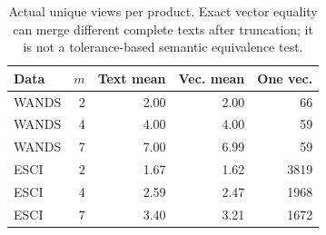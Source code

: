 \begin{table}[htbp]
\caption{Actual unique views per product. Exact vector equality can merge different complete texts after truncation; it is not a tolerance-based semantic equivalence test.}\label{tab:uniqueviews}
\centering\small
\begin{tabular}{lrrrr}\toprule
Data & $m$ & Text mean & Vec. mean & One vec.\\\midrule
WANDS & 2 & 2.00 & 2.00 & 66\\
WANDS & 4 & 4.00 & 4.00 & 59\\
WANDS & 7 & 7.00 & 6.99 & 59\\
ESCI & 2 & 1.67 & 1.62 & 3819\\
ESCI & 4 & 2.59 & 2.47 & 1968\\
ESCI & 7 & 3.40 & 3.21 & 1672\\
\bottomrule\end{tabular}
\end{table}
